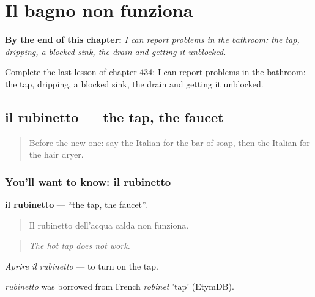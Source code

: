 
\chapter{Il bagno non funziona}
\label{ch:it-il-bagno-non-funziona}

\begin{chapteropening}
\textbf{By the end of this chapter:} \emph{I can report problems in the bathroom: the tap, dripping, a blocked sink, the drain and getting it unblocked.}

Complete the last lesson of chapter 434: I can report problems in the bathroom: the tap, dripping, a blocked sink, the drain and getting it unblocked.
\end{chapteropening}

\section[il rubinetto]{il rubinetto — the tap, the faucet}

\label{lesson:IT-C434-rubinetto}



\begin{quote}
Before the new one: say the Italian for the bar of soap, then the Italian for the hair dryer.
\end{quote}

\subsection*{You'll want to know: il rubinetto}
\textbf{il rubinetto} — \textquotedblleft{}the tap, the faucet\textquotedblright{}.

\begin{quote}
Il rubinetto dell'acqua calda non funziona.
\end{quote}

\begin{quote}
\emph{The hot tap does not work.}
\end{quote}

\emph{Aprire il rubinetto} — to turn on the tap.

\begin{cousinweb}
\emph{rubinetto} was borrowed from French \emph{robinet} 'tap' (EtymDB).
\end{cousinweb}

